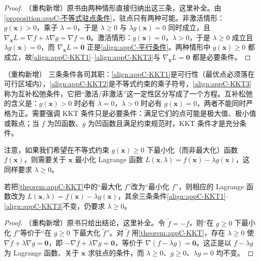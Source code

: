\documentclass[../main.tex]{subfiles}
\begin{document}
\begin{proof}
（重构新增）原书由两种情形直接归纳出这三条，这里补全。由\cref{proposition:appC-不等式驻点条件}，驻点只有两种可能。非激活情形：$g(\bm{x})>0$，乘子 $\lambda=0$，于是 $\lambda\geqslant0$ 与 $\lambda g(\bm{x})=0$ 同时成立，且 $\nabla_{\bm{x}}L=\nabla f+\lambda\nabla g=\nabla f=\bm{0}$。激活情形：$g(\bm{x})=0$，$\lambda>0$，于是 $\lambda\geqslant0$ 成立且 $\lambda g(\bm{x})=0$，而 $\nabla_{\bm{x}}L=\bm{0}$ 正是\eqref{align:appC-平行条件}。两种情形中 $g(\bm{x})\geqslant0$ 都成立，故\eqref{align:appC-KKT1}--\eqref{align:appC-KKT3}与 $\nabla_{\bm{x}}L=\bm{0}$ 都是必要条件。
\end{proof}

\begin{remark}（重构新增）
三条条件各司其职：\eqref{align:appC-KKT1}是可行性（最优点必须落在可行区域内），\eqref{align:appC-KKT2}是不等式约束的乘子符号，\eqref{align:appC-KKT3}称为互补松弛条件，它把“激活/非激活”这一定性区分写成了一个方程。互补松弛的含义是：$g(\bm{x})>0$ 时必有 $\lambda=0$，$\lambda>0$ 时必有 $g(\bm{x})=0$，两者不能同时严格为正。需要强调 KKT 条件只是必要条件：满足它们的点可能是极大值、极小值或鞍点；当 $f$ 为凹函数、$g$ 为凹函数且满足约束规范时，KKT 条件才是充分条件。
\end{remark}

注意，如果我们希望在不等式约束 $g(\bm{x})\geqslant0$ 下最小化（而非最大化）函数 $f(\bm{x})$，则需要关于 $\bm{x}$ 最小化 Lagrange 函数 $L(\bm{x},\lambda)=f(\bm{x})-\lambda g(\bm{x})$，这同样要求 $\lambda\geqslant0$。

\begin{proposition}\label{proposition:appC-最小化KKT}
若把\cref{theorem:appC-KKT}中的“最大化 $f$”改为“最小化 $f$”，则相应的 Lagrange 函数改为 $L(\bm{x},\lambda)=f(\bm{x})-\lambda g(\bm{x})$，其余三条条件\eqref{align:appC-KKT1}--\eqref{align:appC-KKT3}不变，仍要求 $\lambda\geqslant0$。
\end{proposition}

\begin{proof}
（重构新增）原书只给出结论，这里补全。令 $\tilde{f}=-f$，则“在 $g\geqslant0$ 下最小化 $f$”等价于“在 $g\geqslant0$ 下最大化 $\tilde{f}$”。对 $\tilde{f}$ 用\cref{theorem:appC-KKT}，存在 $\lambda\geqslant0$ 使 $\nabla\tilde{f}+\lambda\nabla g=\bm{0}$，即 $-\nabla f+\lambda\nabla g=\bm{0}$，等价于 $\nabla(f-\lambda g)=\bm{0}$。这正是以 $f-\lambda g$ 为 Lagrange 函数、关于 $\bm{x}$ 求驻点的条件，而 $\lambda\geqslant0$、$g\geqslant0$、$\lambda g=0$ 均不变。
\end{proof}
\end{document}
